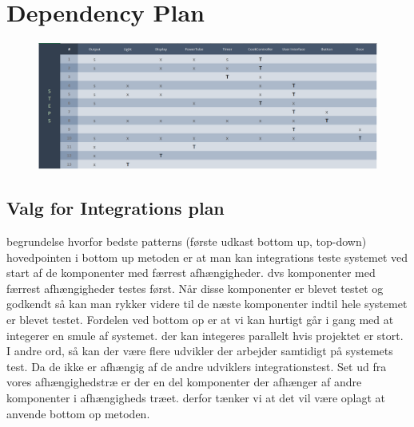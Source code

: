 \section{Dependency Plan}

\begin{figure}[H]
	\centering
	\includegraphics[width=1\linewidth]{../Diagrams/IntegrationPlan}
	\caption[Integration Plan]{}
	\label{fig:integrationplan}
\end{figure}

\subsection{Valg for Integrations plan}
begrundelse hvorfor bedste patterns (første udkast bottom up, top-down)
hovedpointen i bottom up metoden er at man kan integrations teste systemet ved start af de komponenter med færrest afhængigheder. dvs komponenter med færrest afhængigheder testes først. Når disse komponenter er blevet testet og godkendt så kan man rykker videre til de næste komponenter indtil hele systemet er blevet testet. \medskip
Fordelen ved bottom op er at vi kan hurtigt går i gang med at integerer en smule af systemet. der kan integeres parallelt hvis projektet er stort. I andre ord, så kan der være flere udvikler der arbejder samtidigt på systemets test. Da de ikke er afhængig af de andre udviklers integrationstest. \medskip
Set ud fra vores afhængighedstræ er der en del komponenter der afhænger af andre komponenter i afhængigheds træet. derfor tænker vi at det vil være oplagt at anvende bottom op metoden.

